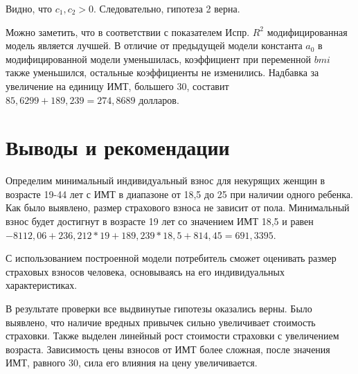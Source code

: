\documentclass[a4paper,12pt]{article}
\begin{document}
Видно, что $c_1, c_2 >0$. Следовательно, гипотеза 2 верна.

Можно заметить, что в соответствии с показателем Испр. $R^2$ модифицированная модель является лучшей. В отличие от предыдущей модели константа $a_0$ в модифицированной модели уменьшилась, коэффициент при переменной $bmi$ также уменьшился, остальные коэффициенты не изменились. Надбавка за увеличение на единицу ИМТ, большего 30, составит $85,6299 + 189,239 = 274,8689$ долларов.






\section{Выводы и рекомендации}
Определим минимальный индивидуальный взнос для некурящих женщин в возрасте 19-44 лет с ИМТ в диапазоне от 18,5 до 25 при наличии одного ребенка. Как было выявлено, размер страхового взноса не зависит от пола. Минимальный взнос будет достигнут в возрасте 19 лет со значением ИМТ 18,5 и равен $-8112,06 + 236,212 * 19 + 189,239 * 18,5 + 814,45 = 691,3395$.

С использованием построенной модели потребитель сможет оценивать размер страховых взносов человека, основываясь на его индивидуальных характеристиках. 

В результате проверки все выдвинутые гипотезы оказались верны.
Было выявлено, что наличие вредных привычек сильно увеличивает стоимость страховки. Также выделен линейный рост стоимости страховки с увеличением возраста. Зависимость цены взносов от ИМТ более сложная, после значения ИМТ, равного 30, сила его влияния на цену увеличивается.
\end{document}
